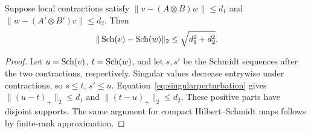 \begin{lemma}\label{lem:domination}
Suppose local contractions satisfy
$\|v-(A\otimes B)w\|\leq d_1$ and
$\|w-(A'\otimes B')v\|\leq d_2$. Then
\[
\|\operatorname{Sch}(v)-\operatorname{Sch}(w)\|_2\leq\sqrt{d_1^2+d_2^2}.
\]
\end{lemma}
\begin{proof}
Let $u=\operatorname{Sch}(v)$, $t=\operatorname{Sch}(w)$, and let $s,s'$ be the Schmidt sequences
after the two contractions, respectively. Singular values decrease
entrywise under contractions, so $s\leq t$, $s'\leq u$.
Equation~\eqref{eq:singularperturbation} gives
$\|(u-t)_+\|_2\leq d_1$ and $\|(t-u)_+\|_2\leq d_2$.
These positive parts have disjoint supports. The same argument for compact
Hilbert--Schmidt maps follows by finite-rank approximation.
\end{proof}

